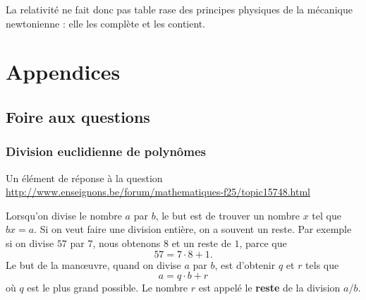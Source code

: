 \documentclass[a4paper,12pt]{book}
\newcounter{numtho}
\theoremstyle{mes_exemples}	\newtheorem{exemple}[numtho]{Exemple}
\theoremstyle{mes_tho}
\newcommand{\defe}[2]{\textbf{#1}\index{#2}}
\begin{document}
La relativité ne fait donc pas table rase des principes physiques de la mécanique newtonienne : elle les complète et les contient.




%	

\appendix

\chapter*{Appendices}

\pagestyle{plain}

\setcounter{section}{0}
\renewcommand{\theequation}{\Alph{section}.\arabic{equation}}
\renewcommand{\thenumtho}{\Alph{section}.\arabic{numtho}}
\renewcommand{\thesection}{\Alph{section}}





%
   \section{Foire aux questions}
%

					\subsection{Division euclidienne de polynômes}

Un élément de réponse à la question\\
\url{http://www.enseignons.be/forum/mathematiques-f25/topic15748.html}

\vspace{1cm}

Lorsqu'on divise le nombre $a$ par $b$, le but est de trouver un nombre $x$ tel que $bx=a$. Si on veut faire une division entière, on a souvent un reste. Par exemple si on divise $57$ par $7$, nous obtenons $8$ et un reste de $1$, parce que
\begin{equation}
	57=7\cdot 8 +1.
\end{equation}
Le but de la man\oe uvre, quand on divise $a$ par $b$, est d'obtenir $q$ et $r$ tels que
\begin{equation}
	a = q\cdot b+r
\end{equation}
où $q$ est le plus grand possible. Le nombre $r$ est appelé le \defe{reste}{Reste} de la division $a/b$.
\end{document}
